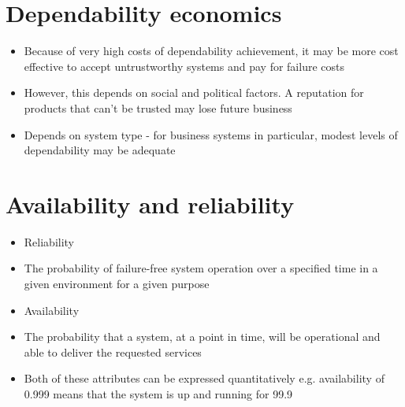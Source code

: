 \section{Dependability economics}
\begin{itemize}
\item Because of very high costs of dependability achievement, it may be more cost effective to accept untrustworthy systems and pay for failure costs

\item However, this depends on social and political factors. A reputation for products that can’t be trusted may lose future business

\item Depends on system type - for business systems in particular, modest levels of dependability may be adequate

\end{itemize}
\section{Availability and reliability}
\begin{itemize}
\item Reliability

  \item The probability of failure-free system operation over a specified time in a given environment for a given purpose

\item Availability

  \item The probability that a system, at a point in time, will be operational and able to deliver the requested services

\item Both of these attributes can be expressed quantitatively e.g. availability of 0.999 means that the system is up and running for 99.9%

\end{itemize}

